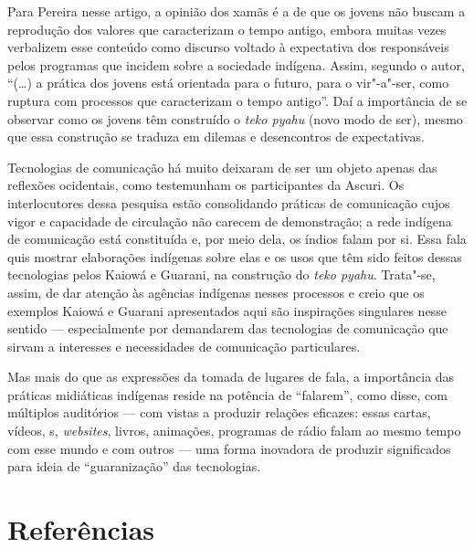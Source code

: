 Para Pereira nesse artigo, a opinião dos xamãs é a de que os jovens não
buscam a reprodução dos valores que caracterizam o tempo antigo, embora
muitas vezes verbalizem esse conteúdo como discurso voltado à
expectativa dos responsáveis pelos programas que incidem sobre a
sociedade indígena. Assim, segundo o autor, ``(\ldots{}) a prática dos jovens
está orientada para o futuro, para o vir"-a"-ser, como ruptura com
processos que caracterizam o tempo antigo''. Daí a importância de se
observar como os jovens têm construído o \emph{teko pyahu} (novo modo de ser),
mesmo que essa construção se traduza em dilemas e desencontros de
expectativas.

Tecnologias de comunicação há muito deixaram de ser um objeto apenas das
reflexões ocidentais, como testemunham os participantes da Ascuri. Os
interlocutores dessa pesquisa estão consolidando práticas de
comunicação cujos vigor e capacidade de circulação não carecem de
demonstração; a rede indígena de comunicação está constituída e, por
meio dela, os índios falam por si. Essa fala quis mostrar elaborações
indígenas sobre elas e os usos que têm sido feitos dessas tecnologias
pelos Kaiowá e Guarani, na construção do \emph{teko pyahu}. Trata"-se, assim,
de dar atenção às agências indígenas nesses processos e creio que os
exemplos Kaiowá e Guarani apresentados aqui são inspirações singulares
nesse sentido --- especialmente por demandarem das tecnologias de
comunicação que sirvam a interesses e necessidades de comunicação
particulares. 

Mas mais do que as expressões da tomada de lugares de fala, a
importância das práticas midiáticas indígenas reside na potência de
``falarem'', como disse, com múltiplos auditórios --- com vistas a produzir
relações eficazes: essas cartas, vídeos, s, \emph{websites}, livros,
animações, programas de rádio falam ao mesmo tempo com esse mundo e com
outros --- uma forma inovadora de produzir significados para ideia de
``guaranização'' das tecnologias.

\section{Referências}\ \  \ \ 

